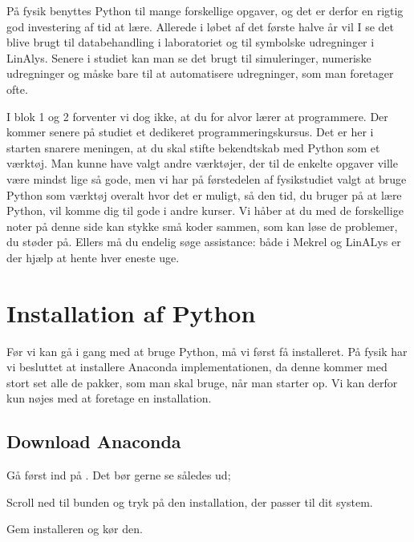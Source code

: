 \documentclass[letterpaper,10pt,english]{jupyterBook}
\begin{document}
På fysik benyttes Python til mange forskellige opgaver, og det er derfor en rigtig god investering af tid at lære. Allerede i løbet af det første halve år vil I se det blive brugt til databehandling i laboratoriet og til symbolske udregninger i LinAlys. Senere i studiet kan man se det brugt til simuleringer, numeriske udregninger og måske bare til at automatisere udregninger, som man foretager ofte.

I blok 1 og 2 forventer vi dog ikke, at du for alvor lærer at programmere. Der kommer senere på studiet et dedikeret programmeringskursus. Det er her i starten snarere meningen, at du skal stifte bekendtskab med Python som et værktøj. Man kunne have valgt andre værktøjer, der til de enkelte opgaver ville være mindst lige så gode, men vi har på førstedelen af fysikstudiet valgt at bruge Python som værktøj overalt hvor det er muligt, så den tid, du bruger på at lære Python, vil komme dig til gode i andre kurser. Vi håber at du med de forskellige noter på denne side kan stykke små koder sammen, som kan løse de problemer, du støder på. Ellers må du endelig søge assistance: både i Mekrel og LinALys er der hjælp at hente hver eneste uge.


\chapter{Installation af Python}
\label{\detokenize{notebooks/Download_guide_anaconda/Download_anaconda_jupyter:installation-af-python}}\label{\detokenize{notebooks/Download_guide_anaconda/Download_anaconda_jupyter::doc}}
Før vi kan gå i gang med at bruge Python, må vi først få installeret. På fysik har vi besluttet at installere Anaconda implementationen, da denne kommer med stort set alle de pakker, som man skal bruge, når man starter op. Vi kan derfor kun nøjes med at foretage en installation.


\section{Download Anaconda}
\label{\detokenize{notebooks/Download_guide_anaconda/Download_anaconda_jupyter:download-anaconda}}
Gå først ind på . Det bør gerne se således ud;

Scroll ned til bunden og tryk på den installation, der passer til dit system.

Gem installeren og kør den.
\end{document}
